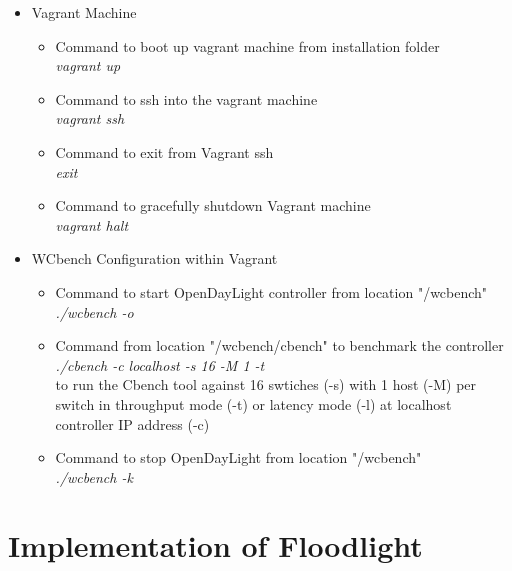 \begin{itemize}
    
    \item Vagrant Machine
    
    \begin{itemize}
    
        \item Command to boot up vagrant machine from installation folder \\
        \emph{vagrant up}
        \item Command to ssh into the vagrant machine\\\emph{vagrant ssh}
        \item Command to exit from Vagrant ssh \\ \emph{exit}
        \item Command to gracefully shutdown Vagrant machine \\ \emph{vagrant halt} 
        
    \end{itemize}
    
    \item WCbench Configuration within Vagrant
    
    \begin{itemize}
    
        \item Command to start OpenDayLight controller from location "/wcbench"\\ \emph{./wcbench -o}
        
        \item Command from location "/wcbench/cbench" to benchmark the controller\\
        \emph{./cbench -c localhost -s 16 -M 1 -t}\\
        
        to run the Cbench tool against 16 swtiches (-s) with 1 host (-M) per switch in throughput mode (-t) or latency mode (-l)
        at localhost controller IP address (-c)
        
        \item Command to stop OpenDayLight from location "/wcbench" \\ 
        \emph{./wcbench -k}
        
    \end{itemize}
    
\end{itemize}

\section*{Implementation of Floodlight}

